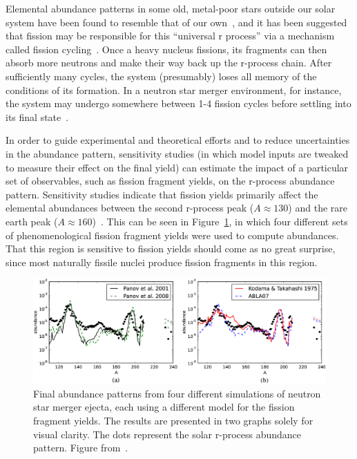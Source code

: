 Elemental abundance patterns in some old, metal-poor stars outside our solar system have been found to resemble that of our own~\cite{Arnould2007}, and it has been suggested that fission may be responsible for this ``universal r process'' via a mechanism called fission cycling~\cite{Beun2008}. Once a heavy nucleus fissions, its fragments can then absorb more neutrons and make their way back up the r-process chain. After sufficiently many cycles, the system (presumably) loses all memory of the conditions of its formation. In a neutron star merger environment, for instance, the system may undergo somewhere between 1-4 fission cycles before settling into its final state~\cite{Mendoza2015}.

In order to guide experimental and theoretical efforts and to reduce uncertainties in the abundance pattern, sensitivity studies (in which model inputs are tweaked to measure their effect on the final yield) can estimate the impact of a particular set of observables, such as fission fragment yields, on the r-process abundance pattern. Sensitivity studies indicate that fission yields primarily affect the elemental abundances between the second r-process peak ($A\approx130$) and the rare earth peak ($A\approx160$)~\cite{Goriely2015a, Eichler2015}. This can be seen in Figure~\ref{fig:rprocabundances}, in which four different sets of phenomenological fission fragment yields were used to compute abundances. That this region is sensitive to fission yields should come as no great surprise, since most naturally fissile nuclei produce fission fragments in this region.

\begin{figure}
	\centering
	\includegraphics[width=0.9\linewidth]{TeX_files/rProc_abundances}
	\caption[Final abundance patterns from four different simulations of neutron star merger ejecta, each using a different model for the fission fragment yields. The results are presented in two graphs solely for visual clarity. The dots represent the solar r-process abundance pattern. Figure from~\cite{Eichler2015}.]{Final abundance patterns from four different simulations of neutron star merger ejecta, each using a different model for the fission fragment yields. The results are presented in two graphs solely for visual clarity. The dots represent the solar r-process abundance pattern. Figure from~\cite{Eichler2015}.}
	\label{fig:rprocabundances}
\end{figure}

